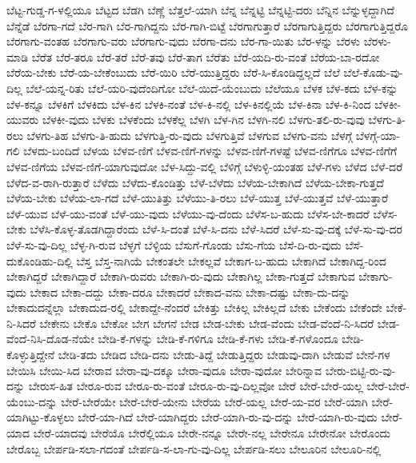 ಬೆಟ್ಟ-ಗುಡ್ಡ-ಗ-ಳಲ್ಲಿಯೂ
ಬೆಟ್ಟದ
ಬೆಡಗಿ
ಬೆಣ್ಣೆ
ಬೆತ್ತಲೆ-ಯಾಗಿ
ಬೆನ್ನ
ಬೆನ್ನಟ್ಟಿ
ಬೆನ್ನಟ್ಟಿ-ದರು
ಬೆನ್ನಿನ
ಬೆನ್ನುಳ್ಳದ್ದಾಗಿದೆ
ಬೆನ್ನೆಡೆ
ಬೆರಗಾ-ಗದೆ
ಬೆರ-ಗಾಗಿ
ಬೆರ-ಗಾಗಿದ್ದನು
ಬೆರ-ಗಾಗಿ-ಬಿಟ್ಟೆ
ಬೆರಗಾಗುತ್ತಾರೆ
ಬೆರಗಾಗುತ್ತಿದ್ದರು
ಬೆರಗಾಗುತ್ತಿದ್ದರೊ
ಬೆರಗಾಗು-ವಂತಹ
ಬೆರಗಾಗು-ವರು
ಬೆರಗಾಗು-ವುದು
ಬೆರಗಾ-ದನು
ಬೆರ-ಗಾ-ಯಿತು
ಬೆರ-ಳನ್ನು
ಬೆರಳು
ಬೆರಳು-ಮಾಡಿ
ಬೆರೆತ
ಬೆರೆ-ತರೂ
ಬೆರೆ-ತರೆ
ಬೆರೆ-ತವು
ಬೆರೆ-ತಾಗ
ಬೆರೆತು
ಬೆರೆ-ಯದಿ-ರು-ವಂತೆ
ಬೆರೆಯ-ಬಾ-ರದೋ
ಬೆರೆಯ-ಬೇಕು
ಬೆರೆ-ಯ-ಬೇಕೆಂಬುದು
ಬೆರೆ-ಯಿರಿ
ಬೆರೆ-ಯುತ್ತಿದ್ದರು
ಬೆರೆ-ಸಿ-ಕೊಂಡಿದ್ದಲ್ಲದೆ
ಬೆಲೆ
ಬೆಲೆ-ಕೊಡು-ವು-ದಿಲ್ಲ
ಬೆಲೆ-ಯನ್ನ-ರಿತು
ಬೆಲೆ-ಯರಿ-ವುದೆಂದಿಗೋ
ಬೆಲೆ-ಯಿದೆ-ಯೆಂಬುದು
ಬೆಲೆಯೂ
ಬೆಳಕ
ಬೆಳ-ಕದು
ಬೆಳ-ಕನ್ನು
ಬೆಳ-ಕನ್ನೂ
ಬೆಳಕಿಗೆ
ಬೆಳಕಿದು
ಬೆಳ-ಕಿನ
ಬೆಳಕಿ-ನಂತೆ
ಬೆಳ-ಕಿ-ನಲ್ಲಿ
ಬೆಳ-ಕಿನಲ್ಲಿಯೆ
ಬೆಳ-ಕಿನಾ
ಬೆಳ-ಕಿ-ನಿಂದ
ಬೆಳಕೀ-ಯುವರು
ಬೆಳಕೀ-ವುದು
ಬೆಳಕು
ಬೆಳಕೆಂದು
ಬೆಳಕೆಲ್ಲ
ಬೆಳಗಿ
ಬೆಳ-ಗಿನ
ಬೆಳಗಿ-ನಲಿ
ಬೆಳಗು-ತಲಿ-ರು-ವುವು
ಬೆಳಗು-ತಿ-ರಲು
ಬೆಳಗು-ತಿಹ
ಬೆಳಗು-ತಿ-ಹುದು
ಬೆಳಗುತ್ತಿ-ರು-ವುದು
ಬೆಳಗುತ್ತಿವೆ
ಬೆಳಗುವ
ಬೆಳಗು-ವನು
ಬೆಳಗ್ಗೆ
ಬೆಳಗ್ಗೆ-ಯಾ-ಗಲಿ
ಬೆಳದು-ಬಂದಿದೆ
ಬೆಳಯ
ಬೆಳವ-ಣಿಗೆ
ಬೆಳವ-ಣಿಗೆ-ಗಳನ್ನು
ಬೆಳವ-ಣಿಗೆ-ಗಳಷ್ಟೆ
ಬೆಳವ-ಣಿಗೆಗೂ
ಬೆಳವ-ಣಿಗೆಗೆ
ಬೆಳವ-ಣಿಗೆಯ
ಬೆಳವ-ಣಿಗೆ-ಯಾಗುವುದೋ
ಬೆಳ-ಸಿದ್ದು-ವಲ್ಲಿ
ಬೆಳಿಗ್ಗೆ
ಬೆಳುಳ್ಳಿ-ಯಂತಹ
ಬೆಳೆ-ಗಳು
ಬೆಳೆದ
ಬೆಳೆ-ದರೆ
ಬೆಳೆದ-ವ-ರಾಗಿ-ರುತ್ತಾರೆ
ಬೆಳೆದು
ಬೆಳೆದು-ಕೊಂಡಿತ್ತು
ಬೆಳೆ-ಬೆಳೆದು
ಬೆಳೆಯ-ಬೇಕಾಗಿದೆ
ಬೆಳೆಯ-ಬೇಕಾ-ಗುತ್ತದೆ
ಬೆಳೆಯ-ಬೇಕು
ಬೆಳೆಯ-ಲಾ-ಗದೆ
ಬೆಳೆ-ಯುತಿತ್ತು
ಬೆಳೆಯು-ತಿ-ರಲು
ಬೆಳೆ-ಯುತ್ತ
ಬೆಳೆ-ಯುತ್ತವೆ
ಬೆಳೆ-ಯುತ್ತಾರೆ
ಬೆಳೆ-ಯುವ
ಬೆಳೆ-ಯು-ವಂತೆ
ಬೆಳೆ-ಯು-ವುದು
ಬೆಳೆಯು-ವು-ದೆಂದು
ಬೆಳೆಸ-ಬ-ಹುದು
ಬೆಳೆಸ-ಬೇ-ಕಾದರೆ
ಬೆಳೆಸ-ಬೇಕು
ಬೆಳೆಸಿ-ಕೊಳ್ಳ-ತೊಡಗಿದ್ದಾರೆಂದು
ಬೆಳೆ-ಸಿ-ದಂತೆ
ಬೆಳೆ-ಸಿ-ದನು
ಬೆಳೆ-ಸಿದರೆ
ಬೆಳೆ-ಸು-ವು-ದಕ್ಕೆ
ಬೆಳೆ-ಸು-ವು-ದರ
ಬೆಳೆ-ಸು-ವು-ದಿಲ್ಲ
ಬೆಳ್ಳ-ಗಿ-ರುವ
ಬೆಳ್ಳಗೆ
ಬೆಳ್ಳಿಯ
ಬೆಸುಗೆ-ಗೊಂಡು
ಬೆಸು-ಗೆಯ
ಬೆಸೆ-ದಿ-ರು-ವುದು
ಬೆಸೆ-ದುಕೊಂಡಿಹು-ದಿಲ್ಲಿ
ಬೆಸ್ತ
ಬೆಸ್ತ-ನಾಗಿಯೆ
ಬೇಕಂತಲೇ
ಬೇಕಲ್ಲವೆ
ಬೇಕಾಗ-ಬ-ಹುದು
ಬೇಕಾಗಿದೆ
ಬೇಕಾಗಿದ್ದ-ರಿಂದ
ಬೇಕಾಗಿದ್ದರೆ
ಬೇಕಾಗಿದ್ದಾರೆ
ಬೇಕಾಗಿ-ರುವರು
ಬೇಕಾಗಿ-ರು-ವುದು
ಬೇಕಾಗಿಲ್ಲ
ಬೇಕಾ-ಗುತ್ತದೆ
ಬೇಕಾಗುವ
ಬೇಕಾಗು-ವುದು
ಬೇಕಾದ
ಬೇಕಾ-ದದ್ದು
ಬೇಕಾ-ದರೂ
ಬೇಕಾದರೆ
ಬೇಕಾದ-ವನು
ಬೇಕಾ-ದಷ್ಟು
ಬೇಕಾ-ದು-ದನ್ನು
ಬೇಕಾದುದನ್ನೆಲ್ಲಾ
ಬೇಕಾದುದ-ರಲ್ಲಿ
ಬೇಕಾದ್ದೇ-ನೆಂದರೆ
ಬೇಕಿತ್ತು
ಬೇಕಿಲ್ಲ
ಬೇಕಿಲ್ಲದೆ
ಬೇಕು
ಬೇಕೆಂದು
ಬೇಕೆಂದೇ
ಬೇಕೆ-ನಿ-ಸಿದರೆ
ಬೇಕೇನು
ಬೇಕೊ
ಬೇಕೋ
ಬೇಗ
ಬೇಗನೆ
ಬೇಡ
ಬೇಡ-ಬೇಕು
ಬೇಡ-ವೆಂದು
ಬೇಡ-ವೆಂದೆ-ನಿ-ಸಿದರೆ
ಬೇಡ-ವೆಂದೆ-ನಿಸಿ-ದೊಡ-ನೆಯೇ
ಬೇಡಿ-ಕೆ-ಗಳನ್ನು
ಬೇಡಿ-ಕೆ-ಗಳಿಗೂ
ಬೇಡಿ-ಕೆ-ಗಳು
ಬೇಡಿ-ಕೆ-ಗಳೊಂದೂ
ಬೇಡಿ-ಕೊಳ್ಳುತ್ತಿದ್ದೇನೆ
ಬೇಡಿ-ತದು
ಬೇಡಿದ
ಬೇಡಿ-ದನು
ಬೇಡು-ತಿದ್ದೆ
ಬೇಡುತ್ತಿದ್ದರು
ಬೇಡುವು-ದಾಗಿ
ಬೇಡುವೆ
ಬೇನೆ-ಗಳ
ಬೇಯಿಸಿ
ಬೇಯಿ-ಸಿದ
ಬೇರಾವ
ಬೇರಾ-ವು-ದಕ್ಕೂ
ಬೇರಾ-ವುದೂ
ಬೇರಾ-ವುದೋ
ಬೇರಿನ್ನಾವ
ಬೇರು-ಬಿಟ್ಟಿ-ರು-ವು-ದನ್ನು
ಬೇರುಸ-ಹಿತ
ಬೇರೂ-ರುವ
ಬೇರೂ-ರು-ವಂತೆ
ಬೇರೂ-ರು-ವು-ದಿಲ್ಲವೋ
ಬೇರೆ
ಬೇರೆ-ಬೇರೆ-ಯಲ್ಲ
ಬೇರೆ-ಬೇರೆ-ಯೆಂಬು-ದನ್ನು
ಬೇರೆ-ಬೇರೆಯೇ
ಬೇರೆ-ಬೇರೆ-ಯೇನು
ಬೇರೆಯ
ಬೇರೆ-ಯಲ್ಲ
ಬೇರೆ-ಯ-ವರ
ಬೇರೆ-ಯಾಗಿ
ಬೇರೆ-ಯಾಗಿಟ್ಟು-ಕೊಳ್ಳಲು
ಬೇರೆ-ಯಾ-ಗಿದೆ
ಬೇರೆ-ಯಾಗಿದ್ದರು
ಬೇರೆ-ಯಾಗಿ-ರು-ವು-ದನ್ನು
ಬೇರೆ-ಯಾಗಿ-ರು-ವುದು
ಬೇರೆ-ಯಾದ
ಬೇರೆ-ಯಾದವು
ಬೇರೆಯೊ
ಬೇರೆಲ್ಲಿಯೂ
ಬೇರೇ-ನನ್ನೂ
ಬೇರೇ-ನಲ್ಲ
ಬೇರೇನೂ
ಬೇರೇನೋ
ಬೇರೊಂದು
ಬೇರೊಬ್ಬ
ಬೇರ್ಪಡಿ-ಸಲಾ-ಗದಂತೆ
ಬೇರ್ಪಡಿ-ಸ-ಲಾ-ಗು-ವು-ದಿಲ್ಲ
ಬೇರ್ಪಡಿ-ಸಲು
ಬೇಲೂರಿನ
ಬೇಲೂರಿ-ನಲ್ಲಿ
